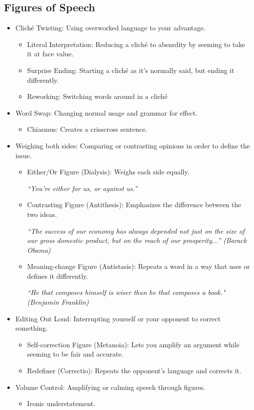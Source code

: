 \subsection{Figures of Speech}
\begin{itemize}
	\item Cliché Twisting: Using overworked language to your advantage.
		\begin{itemize}
			\item Literal Interpretation: Reducing a cliché to absurdity by seeming to take it at face value.
			\item Surprise Ending: Starting a cliché as it's normally said, but ending it differently.
			\item Reworking: Switching words around in a cliché
		\end{itemize}
	\item Word Swap: Changing normal usage and grammar for effect.
		\begin{itemize}
			\item Chiasmus: Creates a crisscross sentence.
		\end{itemize}
	\item Weighing both sides: Comparing or contrasting opinions in order to define the issue.
		\begin{itemize}
			\item Either/Or Figure (Dialysis): Weighs each side equally.
			
			\textit{``You're either for us, or against us.''}
			\item Contrasting Figure (Antithesis): Emphasizes the difference between the two ideas.
			
			\textit{``The success of our economy has always depended not just on the size of our gross domestic product, but on the reach of our prosperity...'' (Barack Obama)}
			\item Meaning-change Figure (Antistasis): Repeats a word in a way that uses or defines it differently. 
			
			\textit{``He that composes himself is wiser than he that composes a book." (Benjamin Franklin)}
		\end{itemize}
	\item Editing Out Loud: Interrupting yourself or your opponent to correct something.
		\begin{itemize}
			\item Self-correction Figure (Metanoia): Lets you amplify an argument while seeming to be fair and accurate.
			\item Redefiner (Correctio): Repeats the opponent's language and corrects it.
		\end{itemize}
	\item Volume Control: Amplifying or calming speech through figures.
		\begin{itemize}
			\item Ironic understatement. 
			

\end{itemize}
\end{itemize}

